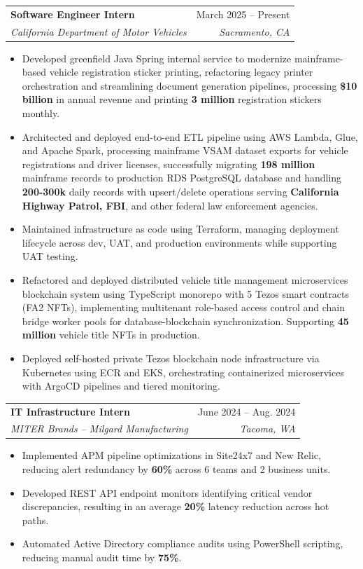 \documentclass[letterpaper,11pt]{article}
\makeatletter
\newcommand{\resumeItem}[1]{
  \item\small{
    {#1 \vspace{-2pt}}
  }
}
\newcommand{\resumeSubheading}[4]{
  \vspace{-2pt}\item
    \begin{tabular*}{0.97\textwidth}[t]{l@{\extracolsep{\fill}}r}
      \textbf{#1} & #2 \\
      \textit{\small#3} & \textit{\small #4} \\
    \end{tabular*}\vspace{-7pt}
}
\newcommand{\resumeItemListStart}{\begin{itemize}}
\newcommand{\resumeItemListEnd}{\end{itemize}\vspace{-5pt}}
\makeatother
\begin{document}
    \resumeSubheading
      {Software Engineer Intern}{March 2025 -- Present}
      {California Department of Motor Vehicles}{Sacramento, CA}
      \resumeItemListStart
      \resumeItem{Developed greenfield Java Spring internal service to modernize mainframe-based vehicle registration sticker printing, refactoring legacy printer orchestration and streamlining document generation pipelines, processing \textbf{\$10 billion} in annual revenue and printing \textbf{3 million} registration stickers monthly.}
      \resumeItem{Architected and deployed end-to-end ETL pipeline using AWS Lambda, Glue, and Apache Spark, processing mainframe VSAM dataset exports for vehicle registrations and driver licenses, successfully migrating \textbf{198 million} mainframe records to production RDS PostgreSQL database and handling \textbf{200-300k} daily records with upsert/delete operations serving \textbf{California Highway Patrol, FBI}, and other federal law enforcement agencies.}
        \resumeItem{Maintained infrastructure as code using Terraform, managing deployment lifecycle across dev, UAT, and production environments while supporting UAT testing.}
	\resumeItem{Refactored and deployed distributed vehicle title management microservices blockchain system using TypeScript monorepo with 5 Tezos smart contracts (FA2 NFTs), implementing multitenant role-based access control and chain bridge worker pools for database-blockchain synchronization. Supporting \textbf{45 million} vehicle title NFTs in production.}
        \resumeItem{Deployed self-hosted private Tezos blockchain node infrastructure via Kubernetes using ECR and EKS, orchestrating containerized microservices with ArgoCD pipelines and tiered monitoring.}
      \resumeItemListEnd

    \resumeSubheading
      {IT Infrastructure Intern}{June 2024 -- Aug. 2024}
      {MITER Brands -- Milgard Manufacturing}{Tacoma, WA}
      \resumeItemListStart
        \resumeItem{Implemented APM pipeline optimizations in Site24x7 and New Relic, reducing alert redundancy by \textbf{60\%} across 6 teams and 2 business units.}
        \resumeItem{Developed REST API endpoint monitors identifying critical vendor discrepancies, resulting in an average \textbf{20\%} latency reduction across hot paths.}
        \resumeItem{Automated Active Directory compliance audits using PowerShell scripting, reducing manual audit time by \textbf{75\%}.}
      \resumeItemListEnd

\end{document}
